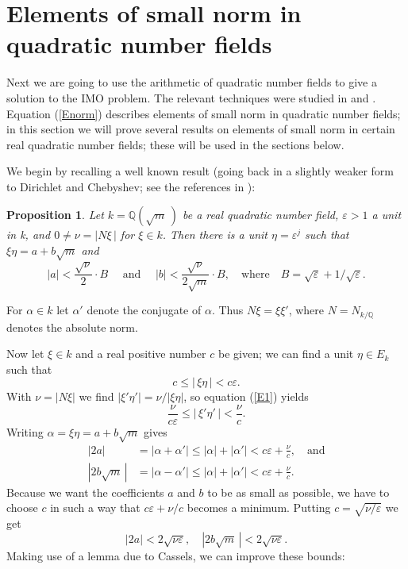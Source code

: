 \documentclass{amsart}
\newtheorem{prop}[lemma]{Proposition}
\newcommand{\Q}{{\mathbb Q}}
\newcommand{\eps}{\varepsilon}
\begin{document}
\section{Elements of small norm in quadratic number fields}

Next we are going to use the arithmetic of quadratic number fields
to give a solution to the IMO problem. The relevant techniques were
studied in \cite{LP} and \cite{Zh}. Equation (\ref{Enorm})
describes elements of small norm in quadratic number fields; in this
section we will prove several results on elements of small norm in
certain real quadratic number fields; these will be used in the
sections below.


We begin by recalling a well known result (going back in a slightly
weaker form to Dirichlet and Chebyshev; see the references in \cite{LQNF}):

\begin{prop}\label{th2}
Let $k = \Q(\sqrt{m}\,)$ be a real quadratic number field,
$\eps > 1$ a unit in k, and $0 \not= \nu = |N\xi\,|$
for $\xi \in k$. Then there is a unit $\eta=\eps^{j}$
such that $\xi \eta = a+b\sqrt{m}$ and 
$$ |a| < \frac{\sqrt{\nu}}{2} \cdot B
   \quad \text{ and } \quad 
   |b| < \frac{\sqrt{\nu}}{2 \sqrt{m}}  \cdot B, 
   \quad \text{where} \quad B = \sqrt{\eps} +1/\sqrt{\eps}. $$
\end{prop}


For $\alpha \in k$ let $\alpha '$ denote the conjugate of $\alpha $.
Thus $N \xi = \xi \xi'$, where $N = N_{k/\Q}$ denotes the absolute norm.

Now let $ \xi \in k$ and a real positive number $c$ be given;
we can find a unit $ \eta \in  E_{k}$ such that
\begin{equation}\label{E1}
   c \leq |\,\xi \eta\,| < c \eps.
\end{equation}
With $\nu = |N\xi|$ we find $ |\xi' \eta'| = \nu/|\xi \eta|$,
so equation (\ref{E1}) yields
\begin{equation}
  \frac{\nu}{c \eps} \leq |\,\xi' \eta'\,| < \frac{\nu}{c}.  
\end{equation}
Writing $ \alpha = \xi \eta = a + b \sqrt{m}$ gives
\begin{align*}
  |2a| & = |\alpha + \alpha '| \leq |\alpha|+|\alpha '|
         < c \eps + \frac{\nu}{c}, \quad \text{and} \\
  |2b\sqrt{m}\,| & = |\alpha -\alpha '| \leq |\alpha|+|\alpha'|
         < c\eps + \frac{\nu}{c}.
\end{align*}
Because we want the coefficients $a$ and $b$ to be as small
as possible, we have to choose $c$ in such a way that
$ c\eps + \nu/c $ becomes a minimum. Putting $c = \sqrt{\nu/\eps} $ we get
\begin{equation}
|2a| < 2\sqrt{\nu\eps},\quad |2b\sqrt{m}\,| < 2\sqrt{\nu\eps}.
\end{equation}
Making use of a lemma due to Cassels, we can improve these bounds:
\end{document}
